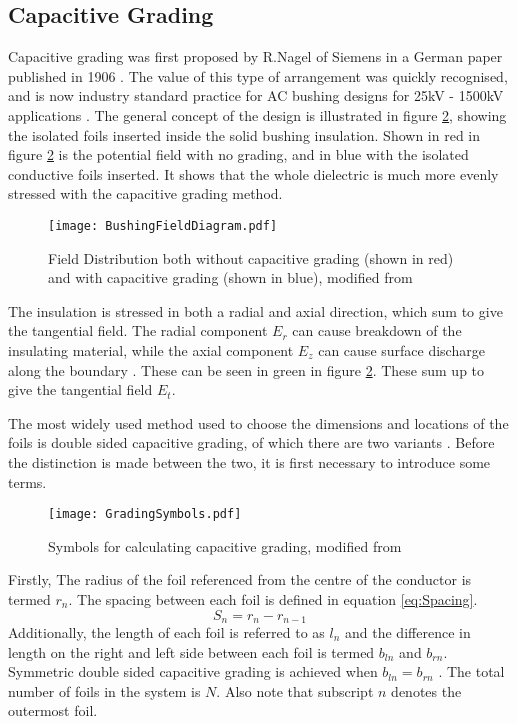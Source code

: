\subsection{Capacitive Grading}
Capacitive grading was first proposed by R.Nagel of Siemens in a German paper published in 1906 \cite{harlow2004electric}.
The value of this type of arrangement was quickly recognised, and is now industry standard practice for AC bushing designs for 25kV - 1500kV applications \cite{james2008condition}.
The general concept of the design is illustrated in figure \ref{figure:fieldgeneric}, showing the isolated foils inserted inside the solid bushing insulation.
Shown in red in figure \ref{figure:fieldgeneric} is the potential field with no grading, and in blue with the isolated conductive foils inserted.
It shows that the whole dielectric is much more evenly stressed with the capacitive grading method.
\begin{figure}[!h]
   \centering
   \texttt{[image: BushingFieldDiagram.pdf]}
   \caption{Field Distribution both without capacitive grading (shown in red) and with capacitive grading (shown in blue), modified from \cite{james2008condition}}
   \label{figure:fieldgeneric}
\end{figure}

The insulation is stressed in both a radial and axial direction, which sum to give the tangential field.
The radial component $E_r$ can cause breakdown of the insulating material, while the axial component $E_z$ can cause surface discharge along the boundary \cite{Ahmed11}.
These can be seen in green in figure \ref{figure:fieldgeneric}.
These sum up to give the tangential field $E_t$.

The most widely used method used to choose the dimensions and locations of the foils is double sided capacitive grading, of which there are two variants \cite{Ahmed11}.
Before the distinction is made between the two, it is first necessary to introduce some terms.
\begin{figure}[!h]
   \centering
   \texttt{[image: GradingSymbols.pdf]}
   \caption{Symbols for calculating capacitive grading, modified from \cite{Ahmed11}}
   \label{figure:fieldgeneric}
\end{figure}
Firstly, The radius of the foil referenced from the centre of the conductor is termed $r_n$. 
The spacing between each foil is defined in equation \ref{eq:Spacing}.
\begin{equation}
   \label{eq:Spacing}
   S_n = r_n - r_{n-1}
\end{equation}
Additionally, the length of each foil is referred to as $l_n$ and the difference in length on the right and left side between each foil is termed $b_{ln}$ and $b_{rn}$. 
Symmetric double sided capacitive grading is achieved when $b_{ln}=b_{rn}$ \cite{Ahmed11}. 
The total number of foils in the system is $N$.
Also note that subscript $n$ denotes the outermost foil.

